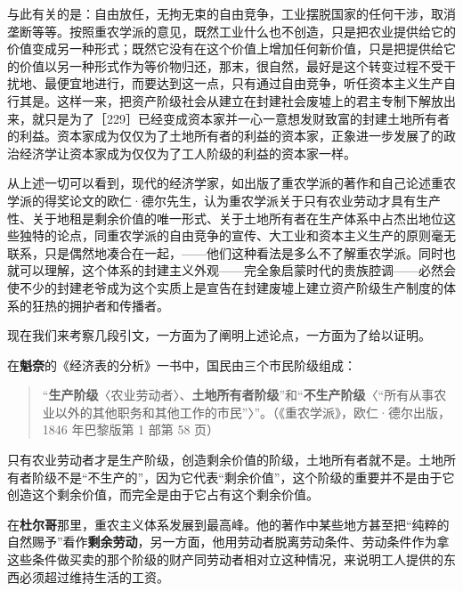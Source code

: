 与此有关的是：自由放任，无拘无束的自由竞争，工业摆脱国家的任何干涉，取消垄断等等。按照重农学派的意见，既然工业什么也不创造，只是把农业提供给它的价值变成另一种形式；既然它没有在这个价值上增加任何新价值，只是把提供给它的价值以另一种形式作为等价物归还，那末，很自然，最好是这个转变过程不受干扰地、最便宜地进行，而要达到这一点，只有通过自由竞争，听任资本主义生产自行其是。这样一来，把资产阶级社会从建立在封建社会废墟上的君主专制下解放出来，就只是为了［229］已经变成资本家并一心一意想发财致富的封建土地所有者的利益。资本家成为仅仅为了土地所有者的利益的资本家，正象进一步发展了的政治经济学让资本家成为仅仅为了工人阶级的利益的资本家一样。

从上述一切可以看到，现代的经济学家，如出版了重农学派的著作和自己论述重农学派的得奖论文的欧仁·德尔先生，认为重农学派关于只有农业劳动才具有生产性、关于地租是剩余价值的唯一形式、关于土地所有者在生产体系中占杰出地位这些独特的论点，同重农学派的自由竞争的宣传、大工业和资本主义生产的原则毫无联系，只是偶然地凑合在一起，——他们这种看法是多么不了解重农学派。同时也就可以理解，这个体系的封建主义外观——完全象启蒙时代的贵族腔调——必然会使不少的封建老爷成为这个实质上是宣告在封建废墟上建立资产阶级生产制度的体系的狂热的拥护者和传播者。


现在我们来考察几段引文，一方面为了阐明上述论点，一方面为了给以证明。

在\textbf{魁奈}的《经济表的分析》一书中，国民由三个市民阶级组成：

\begin{quote}“\textbf{生产阶级}〈农业劳动者〉、\textbf{土地所有者阶级}”和“\textbf{不生产阶级}〈“所有从事农业以外的其他职务和其他工作的市民”〉”。（《重农学派》，欧仁·德尔出版，1846 年巴黎版第 1 部第 58 页）\end{quote}

只有农业劳动者才是生产阶级，创造剩余价值的阶级，土地所有者就不是。土地所有者阶级不是“不生产的”，因为它代表“剩余价值”，这个阶级的重要并不是由于它创造这个剩余价值，而完全是由于它占有这个剩余价值。

在\textbf{杜尔哥}那里，重农主义体系发展到最高峰。他的著作中某些地方甚至把“纯粹的自然赐予”看作\textbf{剩余劳动}，另一方面，他用劳动者脱离劳动条件、劳动条件作为拿这些条件做买卖的那个阶级的财产同劳动者相对立这种情况，来说明工人提供的东西必须超过维持生活的工资。

